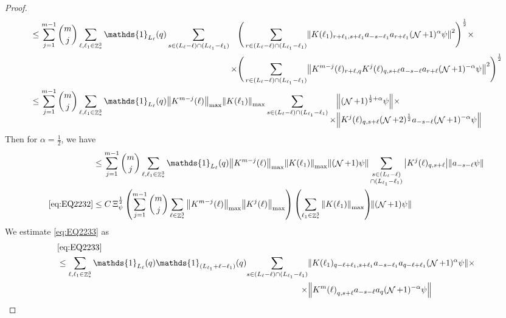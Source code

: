 \documentclass[sn-mathphys, Numbered ,a4paper]{sn-jnl}%
\DeclareMathOperator{\Z}{\mathbb{Z}}
\DeclareMathOperator{\NN}{\mathcal{N}}
\newcommand{\half}{\frac{1}{2}}
\theoremstyle{plain}
\theoremstyle{definition}
\theoremstyle{remark}
\theoremstyle{plain}
\theoremstyle{definition}
\theoremstyle{remark}
\begin{document}
{\begin{proof}
\begin{align}
			&\leq \sum\limits_{j=1}^{m-1} {{m}\choose j} \sum\limits_{\ell, \ell_1\in \Z^3_*} \mathds{1}_{L_{\ell}}(q) \sum\limits_{s\in(L_{\ell}-\ell) \cap (L_{\ell_1}-\ell_1)}   \begin{aligned}[t] \Bigg(\sum\limits_{ r \in (L_{\ell}-\ell) \cap (L_{\ell_1}-\ell_1)}&\norm{ K(\ell_1)_{r+\ell_1,s+\ell_1}a_{-s-\ell_1} a_{r+\ell_1} (\NN+1)^{\alpha}\psi}^2\Bigg)^\half\nonumber \times \\ \times\Bigg(  \sum\limits_{ r \in (L_{\ell}-\ell) \cap (L_{\ell_1}-\ell_1)}&\norm{ K^{m-j}(\ell)_{r+\ell,q} K^{j}(\ell)_{q,s+\ell} a_{-s-\ell}a_{r+\ell} (\NN+1)^{-\alpha} \psi }^2\Bigg)^\half\end{aligned} \nonumber\\
			&\leq \sum\limits_{j=1}^{m-1} {{m}\choose j} \sum\limits_{\ell, \ell_1\in \Z^3_*} \mathds{1}_{L_{\ell}}(q) \norm{K^{m-j}(\ell)}_{\mathrm{max}} \norm{ K(\ell_1)}_{\mathrm{max}} \sum\limits_{s\in(L_{\ell}-\ell) \cap (L_{\ell_1}-\ell_1)} \begin{aligned}[t] &\norm{ (\NN+1)^{\half+\alpha}\psi}\nonumber \times \\ \times&\norm{  K^{j}(\ell)_{q,s+\ell} (\NN+2)^\half a_{-s-\ell} (\NN+1)^{-\alpha} \psi }\end{aligned} \nonumber
		\end{align} 
		Then for $\alpha = \half$, we have
		\begin{align}
			&\leq \sum\limits_{j=1}^{m-1} {{m}\choose j} \sum\limits_{\ell, \ell_1\in \Z^3_*} \mathds{1}_{L_{\ell}}(q) \norm{K^{m-j}(\ell)}_{\mathrm{max}} \norm{ K(\ell_1)}_{\mathrm{max}} \norm{(\NN+1)\psi}\sum\limits_{ \substack{s \in (L_{\ell}-\ell) \\ \cap (L_{\ell_1}-\ell_1)}} \abs{K^{j}(\ell)_{q,s+\ell}} \norm{ a_{-s-\ell}  \psi }\nonumber\\
			\eqref{eq:EQ2232} &\leq  C \, \Xi_{\psi}^\half \left(  \sum\limits_{j=1}^{m-1} {{m}\choose j} \sum\limits_{\ell \in \Z^3_*} \norm{K^{m-j}(\ell)}_{\mathrm{max}} \norm{ K^{j}(\ell)}_{\mathrm{max}}\right) \left( \sum\limits_{ \ell_1\in \Z^3_*}\norm{ K(\ell_1) }_{\mathrm{max}} \right)\!\! \norm{(\NN+1) \psi }\label{eq:estEQ2232}
		\end{align}
		We estimate \eqref{eq:EQ2233} as
		\begin{align}
			&\eqref{eq:EQ2233}\nonumber\\
			&\leq \sum\limits_{\ell, \ell_1\in \Z^3_*} \mathds{1}_{L_{\ell}}(q) \mathds{1}_{(L_{\ell_1}+\ell-\ell_1)}(q) \begin{aligned}[t]\sum\limits_{ s \in (L_{\ell}-\ell) \cap (L_{\ell_1}-\ell_1)}  &\norm{K(\ell_1)_{q-\ell+\ell_1,s+\ell_1} a_{-s-\ell_1} a_{q-\ell+\ell_1}  (\NN+1)^{\alpha}\psi} \times\nonumber\\\times &\norm{ K^m{(\ell)}_{q,s+\ell}  a_{-s-\ell} a_{q} (\NN+1)^{-\alpha} \psi } \end{aligned}\nonumber\\

\end{align}
\end{proof}}
\end{document}
